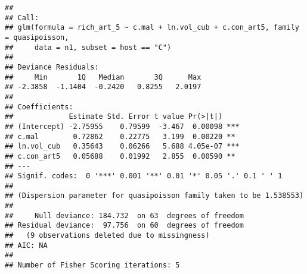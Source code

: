 \documentclass[]{article}
\newenvironment{Shaded}{\begin{snugshade}}{\end{snugshade}}
\newcommand{\KeywordTok}[1]{\textcolor[rgb]{0.13,0.29,0.53}{\textbf{#1}}}
\newcommand{\DataTypeTok}[1]{\textcolor[rgb]{0.13,0.29,0.53}{#1}}
\newcommand{\DecValTok}[1]{\textcolor[rgb]{0.00,0.00,0.81}{#1}}
\newcommand{\StringTok}[1]{\textcolor[rgb]{0.31,0.60,0.02}{#1}}
\newcommand{\CommentTok}[1]{\textcolor[rgb]{0.56,0.35,0.01}{\textit{#1}}}
\newcommand{\OperatorTok}[1]{\textcolor[rgb]{0.81,0.36,0.00}{\textbf{#1}}}
\newcommand{\NormalTok}[1]{#1}
\begin{document}
\begin{Shaded}
\end{Shaded}

\begin{verbatim}
## 
## Call:
## glm(formula = rich_art_5 ~ c.mal + ln.vol_cub + c.con_art5, family = quasipoisson, 
##     data = n1, subset = host == "C")
## 
## Deviance Residuals: 
##     Min       1Q   Median       3Q      Max  
## -2.3858  -1.1404  -0.2420   0.8255   2.0197  
## 
## Coefficients:
##             Estimate Std. Error t value Pr(>|t|)    
## (Intercept) -2.75955    0.79599  -3.467  0.00098 ***
## c.mal        0.72862    0.22775   3.199  0.00220 ** 
## ln.vol_cub   0.35643    0.06266   5.688 4.05e-07 ***
## c.con_art5   0.05688    0.01992   2.855  0.00590 ** 
## ---
## Signif. codes:  0 '***' 0.001 '**' 0.01 '*' 0.05 '.' 0.1 ' ' 1
## 
## (Dispersion parameter for quasipoisson family taken to be 1.538553)
## 
##     Null deviance: 184.732  on 63  degrees of freedom
## Residual deviance:  97.756  on 60  degrees of freedom
##   (9 observations deleted due to missingness)
## AIC: NA
## 
## Number of Fisher Scoring iterations: 5
\end{verbatim}
\end{document}
